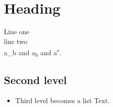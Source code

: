 \section*{ Heading}
\label{sec:org47118c0}
Line one\\
line two\\
a\_b and a\textsubscript{b} and a\textsuperscript{c}.\\
\subsection*{Second level}
\label{sec:orgaf3ed89}
\begin{itemize}
\item Third level becomes a list
\label{sec:org1c59b52}
Text.\\
\end{itemize}
